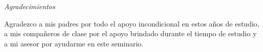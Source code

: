 \documentclass[12pt,spanish, singlespacing,]{MastersDoctoralThesis}
\newcommand\blankpage{%
    \null
    \thispagestyle{empty}%
    \addtocounter{page}{0}%
    \newpage}
\begin{document}
\newpage
\begin{center}
{\huge \textit{Agradecimientos}}\\[1.5cm]
\end{center}

Agradezco a mis padres por todo el apoyo incondicional en estos años de estudio, a mis compañeros de clase por el apoyo brindado durante el tiempo de estudio y a mi asesor por ayudarme en este seminario.



\afterpage{\blankpage}

\mainmatter 
\pagestyle{thesis}


$\ $

$\ $

$\ $




\afterpage{\blankpage}
\appendix

\end{document}
